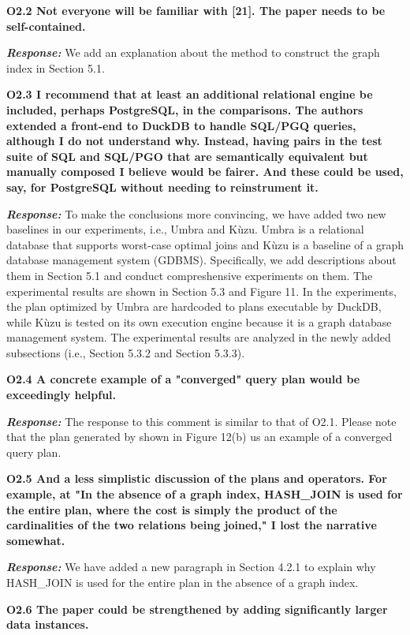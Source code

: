 \textbf{
O2.2 Not everyone will be familiar with [21]. The paper needs to be self-contained. }

\textbf{\textit{Response: }}
We add an explanation about the method to construct the graph index in Section 5.1.

\textbf{
O2.3 I recommend that at least an additional relational engine be included, perhaps PostgreSQL, in the comparisons. The authors extended a front-end to DuckDB to handle SQL/PGQ queries, although I do not understand why. Instead, having pairs in the test suite of SQL and SQL/PGO that are semantically equivalent but manually composed I believe would be fairer. And these could be used, say, for PostgreSQL without needing to reinstrument it.}

\textbf{\textit{Response: }}
To make the conclusions more convincing, we have added two new baselines in our experiments, i.e., Umbra and K\`uzu.
Umbra is a relational database that supports worst-case optimal joins and K\`uzu is a baseline of a graph database management system (GDBMS).
Specifically, we add descriptions about them in Section 5.1 and conduct compreshensive experiments on them.
The experimental results are shown in Section 5.3 and Figure 11.
In the experiments, the plan optimized by Umbra are hardcoded to plans executable by DuckDB, while K\`uzu is tested on its own execution engine because it is a graph database management system.
The experimental results are analyzed in the newly added subsections (i.e., Section 5.3.2 and Section 5.3.3).


\textbf{
O2.4 A concrete example of a "converged" query plan would be exceedingly helpful.}

\textbf{\textit{Response: }}
The response to this comment is similar to that of O2.1.
Please note that the plan generated by \name shown in Figure 12(b) us an example of a converged query plan.

\textbf{
O2.5 And a less simplistic discussion of the plans and operators. For example, at "In the absence of a graph index, HASH\_JOIN is used for the entire plan, where the cost is simply the product of the cardinalities of the two relations being joined," I lost the narrative somewhat. }

\textbf{\textit{Response: }}
We have added a new paragraph in Section 4.2.1 to explain why HASH\_JOIN is used for the entire plan in the absence of a graph index.


\textbf{
O2.6 The paper could be strengthened by adding significantly larger data instances.}

